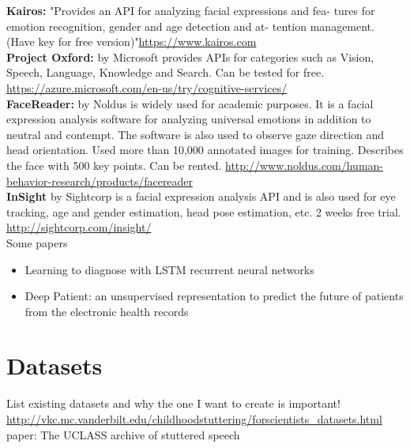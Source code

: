 \textbf{Kairos:} "Provides an API for analyzing facial expressions and fea- tures for emotion recognition, gender and age detection and at- tention management. (Have key for free version)"\url{https://www.kairos.com}\\

\textbf{Project Oxford:} by Microsoft provides APIs for categories such as Vision, Speech, Language, Knowledge and Search. Can be tested for free.
\url{https://azure.microsoft.com/en-us/try/cognitive-services/}\\

\textbf{FaceReader:} by Noldus is widely used for academic purposes. It is a facial expression analysis software for analyzing universal emotions in addition to neutral and contempt. The software is also used to observe gaze direction and head orientation. Used more than 10,000 annotated images for training. Describes the face with 500 key points. Can be rented. 
\url{http://www.noldus.com/human-behavior-research/products/facereader}\\

\textbf{InSight} by Sightcorp is a facial expression analysis API and is also used for eye tracking, age and gender estimation, head pose estimation, etc. 2 weeks free trial.
\url{http://sightcorp.com/insight/}\\

Some papers

\begin{itemize}
    \item Learning to diagnose with LSTM recurrent neural networks
    \item Deep Patient: an unsupervised representation to predict the future of patients from the electronic health records
\end{itemize}








\section{Datasets}

List existing datasets and why the one I want to create is important! \url{http://vkc.mc.vanderbilt.edu/childhoodstuttering/forscientists_datasets.html}\\

paper: The UCLASS archive of stuttered speech\\







